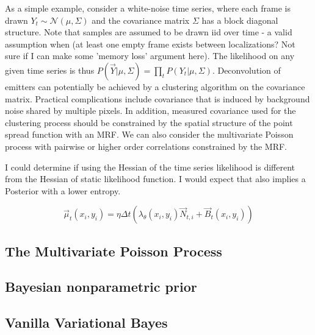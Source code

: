 \documentclass{ucetd}
\begin{document}
As a simple example, consider a white-noise time series, where each frame is drawn $Y_{t}\sim \mathcal{N}(\mu,\Sigma)$ and the covariance matrix $\Sigma$ has a block diagonal structure. Note that samples are assumed to be drawn iid over time - a valid assumption when (at least one empty frame exists between localizations? Not sure if I can make some 'memory loss' argument here). The likelihood on any given time series is thus $P(\vec{Y}|\mu,\Sigma) = \prod_{t}P(Y_{t}|\mu,\Sigma)$. Deconvolution of emitters can potentially be achieved by a clustering algorithm on the covariance matrix. Practical complications include covariance that is induced by background noise shared by multiple pixels. In addition, measured covariance used for the clustering process should be constrained by the spatial structure of the point spread function with an MRF. We can also consider the multivariate Poisson process with pairwise or higher order correlations constrained by the MRF. 

I could determine if using the Hessian of the time series likelihood is different from the Hessian of static likelihood function. I would expect that also implies a Posterior with a lower entropy. 


\begin{equation*}
\vec{\mu}_{t}(x_{i},y_{i}) = \eta\Delta t\left(\lambda_{\theta}(x_{i},y_{i})\vec{N}_{t,i} + \vec{B}_{t}(x_{i},y_{i})\right)
\end{equation*}

\subsection{The Multivariate Poisson Process}




\subsection{Bayesian nonparametric prior}

\subsection{Vanilla Variational Bayes}
\end{document}
